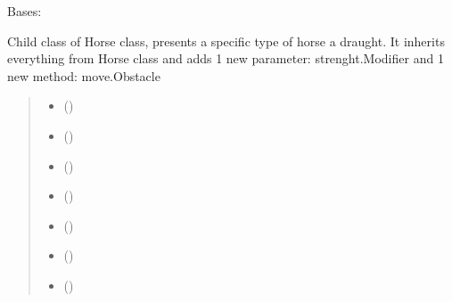 \documentclass[letterpaper,10pt,english]{sphinxmanual}
\begin{document}
\begin{fulllineitems}
\label{\detokenize{main_package:main_package.Horse.Draught}}
\pysigstartsignatures
{}
\pysigstopsignatures
\sphinxAtStartPar
Bases: {\hyperref[\detokenize{main_package:main_package.Horse.Horse}]{}}

\sphinxAtStartPar
Child class of Horse class, presents a specific type of horse \sphinxhyphen{} a draught. It inherits everything from Horse class
and adds 1 new parameter: strenght.Modifier and 1 new method: move.Obstacle
\begin{quote}\begin{description}
\begin{itemize}
\item {} 
\sphinxAtStartPar
{} ()

\item {} 
\sphinxAtStartPar
{} ()

\item {} 
\sphinxAtStartPar
{} ()

\item {} 
\sphinxAtStartPar
{} ()

\item {} 
\sphinxAtStartPar
{} ()

\item {} 
\sphinxAtStartPar
{} ()

\item {} 
\sphinxAtStartPar
{} ()


\end{itemize}
\end{description}
\end{quote}
\end{fulllineitems}
\end{document}
